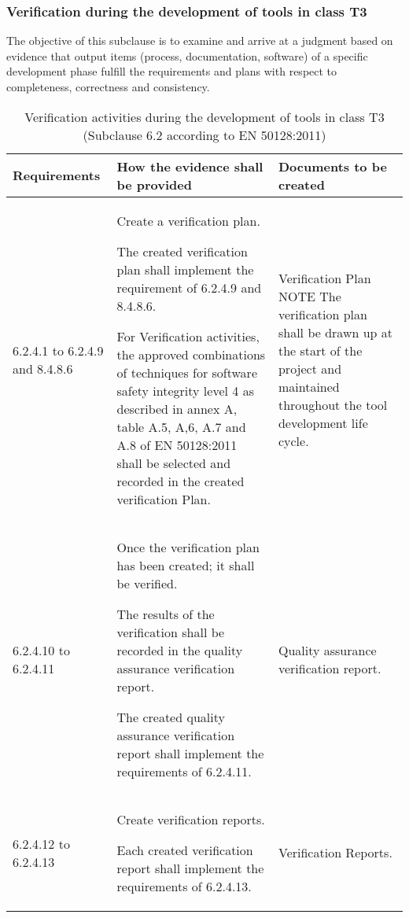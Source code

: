 \documentclass{template/openetcs_report}
\begin{document}
\subsubsection{Verification during the development of tools in class T3}
\begin{flushleft}
The objective of this subclause is to examine and arrive at a judgment based on evidence that output items (process, documentation, software) of a specific development phase fulfill the requirements and plans with respect to completeness, correctness and consistency.
\end{flushleft}
{\footnotesize\sffamily\centering
\begin{longtable}{|p{2cm}|p{9cm}|p{3cm}|}
\caption{Verification activities during the development of tools in class T3 (Subclause 6.2 according to EN 50128:2011)}\\
\hline
\bfseries Requirements & \bfseries How the evidence shall be provided & \bfseries Documents to be created\\
\hline
\hline
\endhead
\hline
\endfoot

6.2.4.1 to 6.2.4.9 and 8.4.8.6 & Create a verification plan.

The created verification plan shall implement the requirement of 6.2.4.9 and 8.4.8.6.

For Verification activities, the approved combinations of techniques for software safety integrity level 4 as described in annex A, table A.5, A,6, A.7 and A.8 of EN 50128:2011 shall be selected and recorded in the created verification Plan.
& Verification Plan
\linebreak
\linebreak
NOTE\linebreak
The verification plan shall be drawn up at the start of the project and maintained throughout the tool development life cycle.\\ 
\hline
6.2.4.10 to 6.2.4.11 & Once the verification plan has been created; it shall be verified. 

The results of the verification shall be recorded in the quality assurance verification report.

The created quality assurance verification report shall implement the requirements of 6.2.4.11.
& Quality assurance verification report.\\ 
\hline
6.2.4.12 to 6.2.4.13 & Create verification reports.

Each created verification report shall implement the requirements of 6.2.4.13.
& Verification Reports.\\ 
\hline
\end{longtable}}
\end{document}

